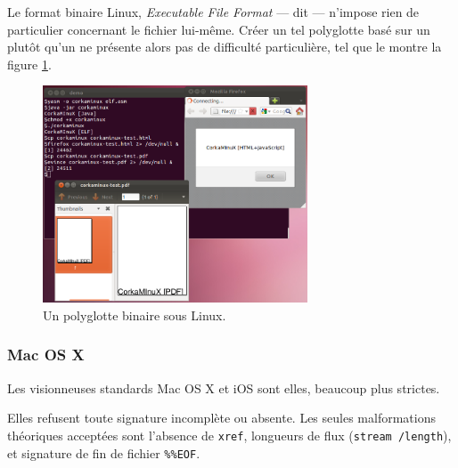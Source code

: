 Le format binaire Linux, {\it Executable File Format} --- dit \ELF --- n'impose rien de particulier concernant le fichier lui-même. Créer un tel polyglotte basé sur un \ELF plutôt qu'un \PE ne présente alors pas de difficulté particulière, tel que le montre la figure \ref{fig:albertini:corkaminux}.

\begin{figure}[p]
  \centering
  \includegraphics[width=0.7\textwidth]{albertini/img/corkaminux}
  \caption{Un polyglotte binaire sous Linux.}
  \label{fig:albertini:corkaminux}
\end{figure}


\subsubsection{Mac OS X}

Les visionneuses \PDF standards Mac OS X et iOS sont elles, beaucoup plus strictes.

Elles refusent toute signature incomplète ou absente. Les seules malformations théoriques acceptées sont l'absence de \texttt{xref}, longueurs de flux (\texttt{stream /length}), et signature de fin de fichier \texttt{\%\%EOF}.

